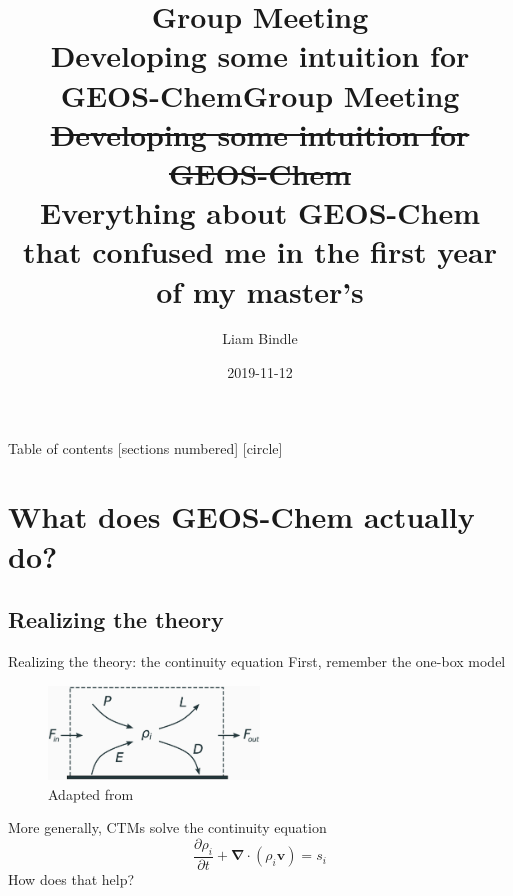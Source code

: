 \documentclass[10pt]{beamer}
\date{2019-11-12}
\author{Liam Bindle}
\begin{document}
\title{Group Meeting \\
\large Developing some intuition for GEOS-Chem}
\maketitle

\title{Group Meeting \\
\large \sout{Developing some intuition for GEOS-Chem} \\
\large Everything about GEOS-Chem that confused me in the first year of my master's}
\maketitle

\begin{frame}{Table of contents}
  [sections numbered]
  [circle]
  \tableofcontents
\end{frame}

\section{What does GEOS-Chem actually do?}
\subsection{Realizing the theory}

\begin{frame}[fragile]{Realizing the theory: the continuity equation}
    First, remember the one-box model
    \begin{figure}
        \centering
        \includegraphics[width=0.5\textwidth]{box-model.eps}
        \captionsetup{labelformat=empty}
        \caption{Adapted from \cite{jacob_introduction_1999}}
    \end{figure}
    \pause
    More generally, CTMs solve the continuity equation
    $$
        \frac{\partial \rho_i}{\partial t} + \boldsymbol \nabla \cdot (\rho_i \boldsymbol v) = s_i
    $$
    \pause
    How does that help?
\end{frame}
\end{document}
